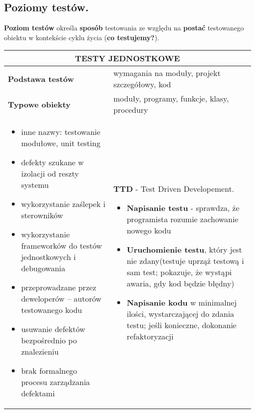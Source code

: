 \documentclass[../main.tex]{subfiles}
\begin{document}
    \subsection{Poziomy testów.}

    \textbf{Poziom testów} określa \textbf{sposób} testowania ze względu na \textbf{postać}
    testowanego obiektu w kontekście cyklu życia (\textbf{co testujemy?}).


    \begin{table}[H]
        \begin{center}
            \begin{tabular}{| p{8cm}| p{8cm}|}
                \hline
                \multicolumn{2}{|c|}{ \textbf{TESTY JEDNOSTKOWE}}\\
                \hline
                \textbf{Podstawa testów} & wymagania na moduły, projekt szczegółowy, kod\\
                \hline
                \textbf{Typowe obiekty} & moduły, programy, funkcje, klasy, procedury\\
                \hline
                \hline
                \begin{itemize}
                    \item inne nazwy: testowanie modułowe, unit testing
                    \item defekty szukane w izolacji od reszty systemu
                    \item wykorzystanie zaślepek i sterowników
                    \item wykorzystanie frameworków do testów jednostkowych i debugowania
                    \item przeprowadzane przez deweloperów – autorów testowanego kodu
                    \item usuwanie defektów bezpośrednio po znalezieniu
                    \item brak formalnego procesu zarządzania defektami
                \end{itemize}
                &
                \textbf{TTD} - Test Driven Developement.
                \begin{itemize}
                    \item \textbf{Napisanie testu} - sprawdza, że programista rozumie zachowanie nowego kodu
                    \item \textbf{Uruchomienie testu}, który jest nie zdany(testuje uprząż testową i sam test; pokazuje,
                    że wystąpi awaria, gdy kod będzie błędny)
                    \item \textbf{Napisanie kodu} w minimalnej ilości, wystarczającej do zdania testu; jeśli
                    konieczne, dokonanie refaktoryzacji
                \end{itemize}\\
                \hline
            \end{tabular}
        \end{center}
    \end{table}
\end{document}
